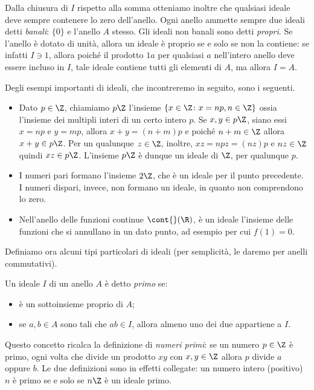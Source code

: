 Dalla chiusura di $I$ rispetto alla somma otteniamo inoltre che qualsiasi ideale deve sempre contenere lo zero dell'anello.
Ogni anello ammette sempre due ideali detti \emph{banali}: $\{0\}$ e l'anello $A$ stesso.
Gli ideali non banali sono detti \emph{propri}.
Se l'anello è dotato di unità, allora un ideale è proprio se e solo se non la contiene: se infatti $I\ni 1$, allora poich\'e il prodotto $1a$ per qualsiasi $a$ nell'intero anello deve essere incluso in $I$, tale ideale contiene tutti gli elementi di $A$, ma allora $I=A$.

Degli esempi importanti di ideali, che incontreremo in seguito, sono i seguenti.
\begin{itemize}
	\item Dato $p\in\Z$, chiamiamo $p\Z$ l'insieme $\{x\in\Z\colon x=np, n\in\Z\}$ ossia l'insieme dei multipli interi di un certo intero $p$.
		Se $x,y\in p\Z$, siano essi $x=np$ e $y=mp$, allora $x+y=(n+m)p$ e poich\'e $n+m\in\Z$ allora $x+y\in p\Z$.
		Per un qualunque $z\in\Z$, inoltre, $xz=npz=(nz)p$ e $nz\in\Z$ quindi $xz\in p\Z$.
		L'insieme $p\Z$ è dunque un ideale di $\Z$, per qualunque $p$.
	\item I numeri pari formano l'insieme $2\Z$, che è un ideale per il punto precedente.
		I numeri dispari, invece, non formano un ideale, in quanto non comprendono lo zero.
	\item Nell'anello delle funzioni continue $\cont{}(\R)$, è un ideale l'insieme delle funzioni che si annullano in un dato punto, ad esempio per cui $f(1)=0$.
\end{itemize}

Definiamo ora alcuni tipi particolari di ideali (per semplicità, le daremo per anelli commutativi).
\begin{definizione} \label{d:ideale-primo}
	Un ideale $I$ di un anello $A$ è detto \emph{primo} se:
	\begin{itemize}
		\item è un sottoinsieme proprio di $A$;
		\item se $a,b\in A$ sono tali che $ab\in I$, allora almeno uno dei due appartiene a $I$.
	\end{itemize}
\end{definizione}
Questo concetto ricalca la definizione di \emph{numeri primi}: se un numero $p\in\Z$ è primo, ogni volta che divide un prodotto $xy$ con $x,y\in\Z$ allora $p$ divide $a$ oppure $b$.
Le due definizioni sono in effetti collegate: un numero intero (positivo) $n$ è primo se e solo se $n\Z$ è un ideale primo.
 
